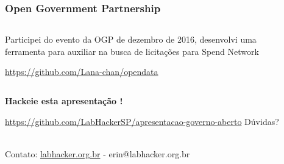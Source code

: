\documentclass{beamer}
\newcommand{\lmr}{\fontfamily{lmr}\selectfont} %
\begin{document}
\begin{frame}
  \frametitle{Open Government Partnership}
  \begin{columns}
    \begin{column}{0.5\textwidth}
      Participei do evento da OGP de dezembro de 2016, desenvolvi uma ferramenta para auxiliar na busca de licitações para Spend Network
      
      \vspace{\baselineskip}%
      \url{https://github.com/Lana-chan/opendata}
    \end{column}
    \begin{column}{0.5\textwidth}
    \end{column}
  \end{columns}
\end{frame}

\begin{frame}
  \centering 
  \begin{Large}
    \textbf{Hackeie esta apresentação \lmr{\LaTeX}!}\par
    \url{https://github.com/LabHackerSP/apresentacao-governo-aberto}
    \bigbreak
    Dúvidas?
  \end{Large}\\
  \vspace{3em}
  Contato: \url{labhacker.org.br} - erin@labhacker.org.br
\end{frame}
\end{document}
